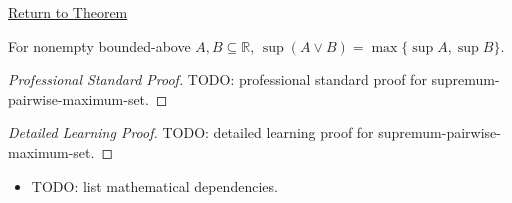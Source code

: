 \newpage
{}
\label{prf:supremum-pairwise-maximum-set}

\begin{remark*}[Return]
\hyperref[thm:supremum-pairwise-maximum-set]{Return to Theorem}
\end{remark*}

\begin{theorem*}
For nonempty bounded-above $A,B\subseteq\mathbb{R}$,
$\sup(A\vee B)=\max\{\sup A,\sup B\}$.
\end{theorem*}

\begin{proof}[Professional Standard Proof]
\LRAProofBodyStart
TODO: professional standard proof for supremum-pairwise-maximum-set.
\end{proof}

\begin{proof}[Detailed Learning Proof]
\LRAProofBodyStart
TODO: detailed learning proof for supremum-pairwise-maximum-set.
\end{proof}

\begin{remark*}
\end{remark*}

\begin{dependencies}
\begin{itemize}
  \item TODO: list mathematical dependencies.
\end{itemize}
\end{dependencies}

\clearpage
